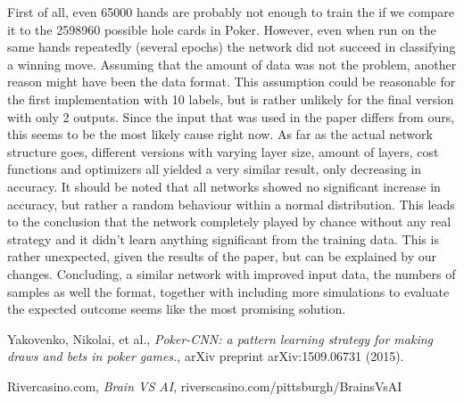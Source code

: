 \documentclass[]{report}
\begin{document}
First of all, even 65000 hands are probably not enough to train the if we compare it to the 2598960 possible hole cards in Poker. However, even when run on the same hands repeatedly (several epochs) the network did not succeed in classifying a winning move. Assuming that the amount of data was not the problem, another reason might have been the data format. This assumption could be reasonable for the first implementation with 10 labels, but is rather unlikely for the final version with only 2 outputs. Since the input that was used in the paper differs from ours, this seems to be the most likely cause right now. As far as the actual network structure goes, different versions with varying layer size, amount of layers, cost functions and optimizers all yielded a very similar result, only decreasing in accuracy. It should be noted that all networks showed no significant increase in accuracy, but rather a random behaviour within a normal distribution. This leads to the conclusion that the network completely played by chance without any real strategy and it didn't learn anything significant from the training data. This is rather unexpected, given the results of the paper, but can be explained by our changes.
Concluding, a similar network with improved input data, the numbers of samples as well the format, together with including more simulations to evaluate the expected outcome  seems like the most promising solution.

\begin{thebibliography}{}
	 Yakovenko, Nikolai, et al., \emph{Poker-CNN: a pattern learning strategy for making draws and bets in poker games.}, arXiv preprint arXiv:1509.06731 (2015).
	
	 Rivercasino.com, \emph{Brain VS AI},
	riverscasino.com/pittsburgh/BrainsVsAI

\end{thebibliography}  
\end{document}
